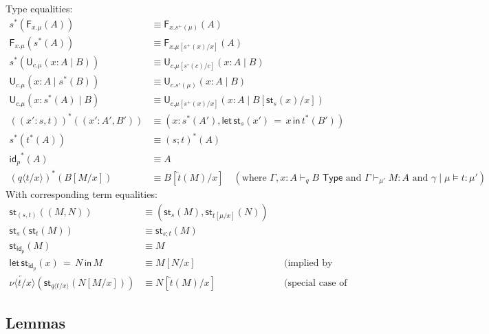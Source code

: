 \documentclass[10pt]{article}
\theoremstyle{definition}
\newcommand{\TYPE}{\,\,\mathsf{Type}}
\newcommand{\rewrite}[2]{\overleftarrow{#1}(#2)}
\newcommand\F[2]{\ensuremath{\mathsf{F}_{#1}(#2)}}
\newcommand\U[3]{\ensuremath{\mathsf{U}_{#1}(#2 \mid #3)}}
\newcommand\St[2]{\ensuremath{{#1}^*(#2)}}
\newcommand\StI[2]{\ensuremath{\mathsf{st}_{#1}(#2)}}
\newcommand\StE[4]{\ensuremath{\mathsf{let} \, \StI{#1}{#3} \, = \, {#2} \, \mathsf{in} \, #4}}
\newcommand\TermTwo[4]{\ensuremath{#1 \mid #3 \vDash #2 : #4}}
\newcommand\TrPlus[2]{\ensuremath{{#1}^+(#2)}}
\newcommand\TrCirc[2]{\ensuremath{{#1}^\circ(#2)}}
\newcommand{\id}{\mathsf{id}}
\newcommand\ap[2]{\ensuremath{#1 \langle #2 \rangle }}
\newcommand{\telety}[3]{\ensuremath{(#1{:}#2,#3)}}
\begin{document}
Type equalities:
\begin{align*}
\St{s}{\F{x.\mu}{A}} &\equiv \F{x.\TrPlus{s}{\mu}}{A} \\
\F{x.\mu}{\St{s}{A}} &\equiv \F{x.\mu[\TrPlus{s}{x}/x]}{A} \\
\St{s}{\U{c.\mu}{x:A}{B}} &\equiv \U{c.\mu[\TrCirc{s}{c}/c]}{x:A}{B} \\
\U{c.\mu}{x:A}{\St{s}{B}} &\equiv \U{c.\TrCirc{s}{\mu}}{x:A}{B} \\
\U{c.\mu}{x:\St{s}{A}}{B} &\equiv \U{c.\mu[\TrPlus{s}{x}/x]}{x:A}{B[\StI{s}{x}/x]} \\
\St{(\telety{x'}{s}{t})}{\telety{x'}{A'}{B'}} & \equiv \telety{x}{\St{s}{A'}}{\StE{s}{x}{x'}{\St{t}{B'}}} \\
\St{s}{\St{t}{A}} &\equiv \St{(s;t)}{A} \\
\St{\id_p}{A} &\equiv A\\
\St{(\ap{q}{t/x})}{B[M/x]} & \equiv B[\rewrite{t}{M}/x] \quad (\text{where }
\Gamma,x:A \vdash_q B \TYPE \text{ and } \Gamma \vdash_{\mu'} M : A \text{ and }
\TermTwo{\gamma}{t}{\mu}{\mu'})
\end{align*}
With corresponding term equalities: 
\begin{align*}
\StI{(s, t)}{(M, N)} &\equiv (\StI{s}{M}, \StI{t[\mu/x]}{N}) \\
\StI{s}{\StI{t}{M}} &\equiv \StI{s;t}{M} \\
\StI{\id_p}{M} &\equiv M \\
\StE{\id_p}{N}{x}{M} &\equiv M[N/x] && \text{(implied by previous)}\\
\rewrite{\ap{\nu}{t/x}}{\StI{\ap{q}{t/x}}{N[M/x]}} &\equiv N[\rewrite{t}{M}/x]  && \text{(special case of equation for rewrite on substitutions)}
\end{align*}


\subsection{Lemmas}
\end{document}
